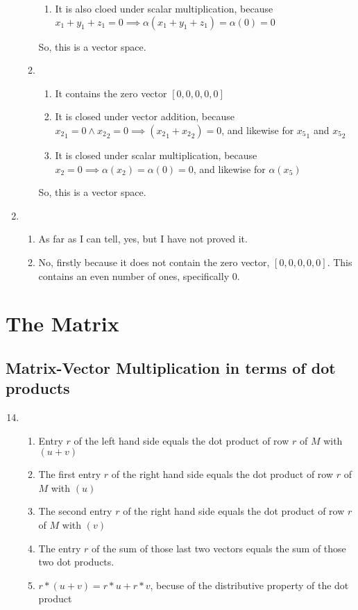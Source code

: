 \documentclass{article}
\begin{document}
\begin{enumerate}
\begin{enumerate}
\begin{enumerate}
                        \item It is also cloed under scalar multiplication, because $x_1 + y_1 + z_1 = 0 \implies \alpha (x_1 + y_1 + z_1) = \alpha (0) = 0$
                    \end{enumerate}
                    So, this is a vector space.
                \item 
                    \begin{enumerate}
                        \item It contains the zero vector $[0,0,0,0,0]$
                        \item It is closed under vector addition, because ${x_2}_1 = 0 \land {x_2}_2 = 0 \implies ({x_2}_1 + {x_2}_2) = 0$, and likewise for ${x_5}_1$ and ${x_5}_2$
                        \item It is closed under scalar multiplication, because $x_2 = 0 \implies \alpha (x_2) = \alpha (0) = 0$, and likewise for $\alpha (x_5)$
                    \end{enumerate}
                    So, this is a vector space.
            \end{enumerate}
        \item 
            \begin{enumerate}
                \item As far as I can tell, yes, but I have not proved it.
                \item No, firstly because it does not contain the zero vector, $[0,0,0,0,0]$. This contains an even number of ones, specifically $0$.
            \end{enumerate}
    \end{enumerate}
    \section{The Matrix}
    \setcounter{subsection}{5}
    \subsection{Matrix-Vector Multiplication in terms of dot products}
    \begin{enumerate}
        \setcounter{enumi}{13}
        \item 
            \begin{enumerate}
                \item Entry $r$ of the left hand side equals the dot product of row $r$ of $M$ with $(u+v)$
                \item The first entry $r$ of the right hand side equals the dot product of row $r$ of $M$ with $(u)$
                \item The second entry $r$ of the right hand side equals the dot product of row $r$ of $M$ with $(v)$
                \item The entry $r$ of the sum of those last two vectors equals the sum of those two dot products.
                \item $r * (u+v) = r*u + r*v$, becuse of the distributive property of the dot product
            \end{enumerate}
    \end{enumerate}
\end{document}
